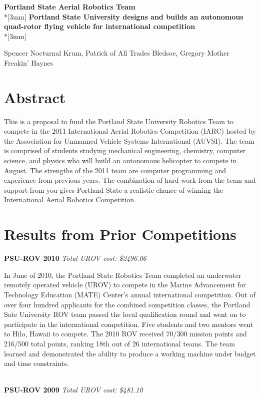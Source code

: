 \documentclass{article}
\begin{document}
\begin{center}
{\Large{\bf Portland State Aerial Robotics Team}}\\*[3mm]
{\bf Portland State University designs and builds an autonomous quad-rotor flying vehicle for international competition} \\*[3mm]

Spencer Nocturnal Krum, Patrick of All Trades Bledsoe, Gregory Mother Freakin' Haynes

\end{center}


\section{Abstract} This is a  proposal to fund the Portland State University Robotics Team to compete in the 2011 International Aerial Robotics Competition (IARC) hosted by the Association for Unmanned Vehicle Systems International (AUVSI). The team is comprised of students studying mechanical engineering,
 chemistry, computer science, and physics who will build an autonomous helicopter to compete in August.  The strengths of the 2011 team are computer programming and experience from previous years. The combination of hard work 
from the team and support from you gives Portland State a realistic chance of winning the International Aerial Robotics Competition.  


\section{Results from Prior Competitions}

\noindent
{\bf PSU-ROV 2010}
{\it Total UROV cost: \$2496.06}

In June of 2010, the Portland State Robotics Team completed an underwater remotely operated vehicle (UROV) to compete in the Marine Advancement for Technology Education (MATE) Center's annual international competition. Out of over four hundred applicants for the combined competition classes, the Portland Sate University ROV team passed the local qualification round and went on to participate in the international competition. 
Five students and two mentors went to Hilo, Hawaii to compete. The 2010 ROV received 70/300 mission points and 216/500 total points, 
ranking 18th out of 26 international teams. The team learned and demonstrated the ability to produce a working machine under budget and time constraints.

\ \\
\noindent
{\bf PSU-ROV 2009}
{\it Total UROV cost: \$481.10}
\end{document}
